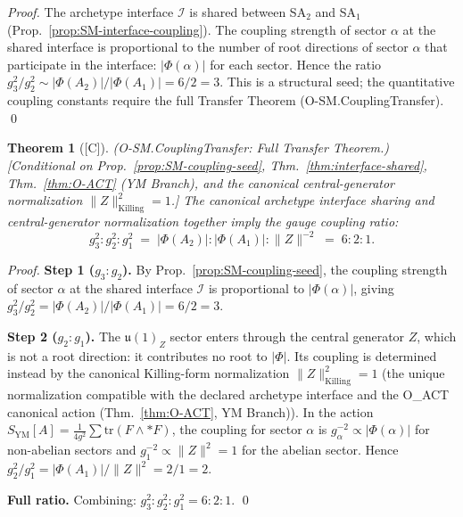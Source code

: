 \documentclass[12pt,oneside]{amsbook}
\theoremstyle{plain}
\newtheorem{theorem}{Theorem}[section]
\theoremstyle{definition}
\theoremstyle{remark}
\newcommand{\status}[1]{\textup{[#1]}}
\begin{document}
\begin{proof}
The archetype interface $\mathcal{I}$ is shared between SA$_2$
and SA$_1$ (Prop.~\ref{prop:SM-interface-coupling}). The
coupling strength of sector $\alpha$ at the shared interface is
proportional to the number of root directions of sector $\alpha$
that participate in the interface: $|\Phi(\alpha)|$ for each sector.
Hence the ratio $g_3^2/g_2^2 \sim |\Phi(A_2)|/|\Phi(A_1)| = 6/2 = 3$.
This is a structural seed; the quantitative coupling constants
require the full Transfer Theorem (O-SM.CouplingTransfer). \qed
\end{proof}

\begin{theorem}[\status{C}]\label{thm:SM-coupling-transfer-full}
\textup{(O-SM.CouplingTransfer: Full Transfer Theorem.)}
\textup{[Conditional on Prop.~\ref{prop:SM-coupling-seed},
Thm.~\ref{thm:interface-shared}, Thm.~\ref{thm:O-ACT} (YM Branch),
and the canonical central-generator normalization
$\|Z\|_{\mathrm{Killing}}^2 = 1$.]}
The canonical archetype interface sharing and central-generator
normalization together imply the gauge coupling ratio:
\[
 g_3^2 : g_2^2 : g_1^2
 \;=\; |\Phi(A_2)| : |\Phi(A_1)| : \|Z\|^{-2}
 \;=\; 6 : 2 : 1.
\]
\end{theorem}

\begin{proof}
\textbf{Step 1 ($g_3 : g_2$).} By
Prop.~\ref{prop:SM-coupling-seed}, the coupling strength of sector
$\alpha$ at the shared interface $\mathcal{I}$ is proportional to
$|\Phi(\alpha)|$, giving $g_3^2/g_2^2 = |\Phi(A_2)|/|\Phi(A_1)|
= 6/2 = 3$.

\textbf{Step 2 ($g_2 : g_1$).} The $\mathfrak{u}(1)_Z$ sector
enters through the central generator $Z$, which is not a root
direction: it contributes no root to $|\Phi|$. Its coupling
is determined instead by the canonical Killing-form normalization
$\|Z\|_{\mathrm{Killing}}^2 = 1$ (the unique normalization
compatible with the declared archetype interface and the O\_ACT
canonical action (Thm.~\ref{thm:O-ACT}, YM Branch)). In the
action $S_{\mathrm{YM}}[A] = \tfrac{1}{4g^2}\sum\mathrm{tr}(F
\wedge {*}F)$, the coupling for sector $\alpha$ is
$g_\alpha^{-2} \propto |\Phi(\alpha)|$ for non-abelian sectors
and $g_1^{-2} \propto \|Z\|^2 = 1$ for the abelian sector. Hence
$g_2^2/g_1^2 = |\Phi(A_1)|/\|Z\|^2 = 2/1 = 2$.

\textbf{Full ratio.} Combining: $g_3^2 : g_2^2 : g_1^2 =
6 : 2 : 1$. \qed
\end{proof}
\end{document}
